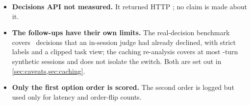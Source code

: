 \begin{itemize}
    computer-use gate and added the side-effect guard and clause to  after these
    measurements (\cref{sec:since}). This report describes the system as it was measured.
  \item \textbf{Decisions API not measured.} It returned HTTP \HoldProbeStatus; no claim is made about it.
  \item \textbf{The follow-ups have their own limits.} The real-decision benchmark covers \TrN\ decisions
    that an in-session judge had already declined, with strict labels and a clipped task view; the caching
    re-analysis covers at most \CaTurns-turn synthetic sessions and does not isolate the switch. Both are
    set out in \cref{sec:caveats,sec:caching}.
  \item \textbf{Only the first option order is scored.} The second order is logged but used only for
    latency and order-flip counts.
\end{itemize}
